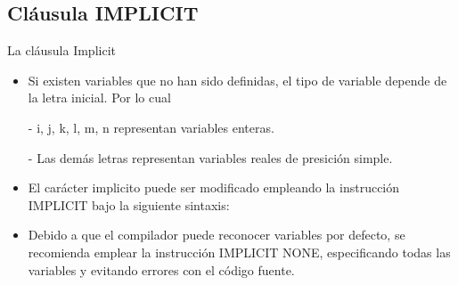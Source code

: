 
\subsection{Cláusula IMPLICIT}

\begin{frame}[fragile]{La cláusula Implicit}
 \begin{itemize}[<+(0)->]
  \item Si existen variables que no han sido definidas, el tipo de variable depende de la letra inicial. Por lo cual
  \item[-] i, j, k, l, m, n representan variables enteras.
  \item[-] Las demás letras representan variables reales de presición simple.
  \item El carácter implicito puede ser modificado empleando la instrucción IMPLICIT bajo la siguiente sintaxis:\\
  \item Debido a que el compilador puede reconocer variables por defecto, se recomienda emplear la instrucción IMPLICIT NONE, especificando todas las variables y evitando errores con el código fuente.
 \end{itemize}
\end{frame}
